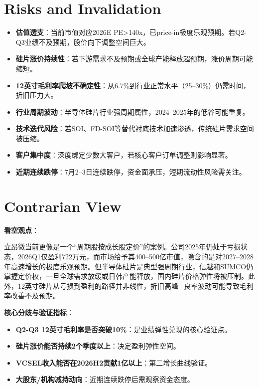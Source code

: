 \documentclass[a4paper,11pt,fontset=none]{ctexart}
\begin{document}
\section{Risks and Invalidation}

\begin{riskbox}[核心风险]
\begin{itemize}
  \item \textbf{估值透支}：当前市值对应2026E PE>140x，已price-in极度乐观预期。若Q2-Q3业绩不及预期，股价向下调整空间巨大。
  \item \textbf{硅片涨价持续性}：若下游需求不及预期或全球产能释放超预期，涨价周期可能缩短。
  \item \textbf{12英寸毛利率爬坡不确定性}：从6.7\%到行业正常水平（25--30\%）仍需时间，折旧压力大。
  \item \textbf{行业周期波动}：半导体硅片行业强周期属性，2024--2025年的低谷可能重复。
  \item \textbf{技术迭代风险}：若SOI、FD-SOI等替代衬底技术加速渗透，传统硅片需求空间被压缩。
  \item \textbf{客户集中度}：深度绑定少数大客户，若核心客户订单调整则影响显著。
  \item \textbf{近期连续跌停}：7月2--3日连续跌停，资金面承压，短期流动性风险需关注。
\end{itemize}
\end{riskbox}

\section{Contrarian View}

\textbf{看空观点}：

立昂微当前更像是一个``周期股按成长股定价''的案例。公司2025年仍处于亏损状态，2026Q1仅盈利722万元，而市场给予其400--500亿市值，隐含的是对2027--2028年高速增长的极度乐观预期。但半导体硅片是典型强周期行业，信越和SUMCO仍掌握定价权，一旦全球需求放缓或日韩产能释放，国内硅片价格弹性将被压制。此外，12英寸硅片从亏损到盈利的路径并非线性，折旧高峰+良率波动可能导致毛利率改善不及预期。

\textbf{核心分歧与验证指标}：
\begin{itemize}
  \item \textbf{Q2-Q3 12英寸毛利率是否突破10\%}：是业绩弹性兑现的核心验证点。
  \item \textbf{硅片涨价能否持续2个季度以上}：决定盈利弹性空间。
  \item \textbf{VCSEL收入能否在2026H2贡献1亿以上}：第二增长曲线验证。
  \item \textbf{大股东/机构减持动向}：近期连续跌停后需观察资金态度。
\end{itemize}
\end{document}
